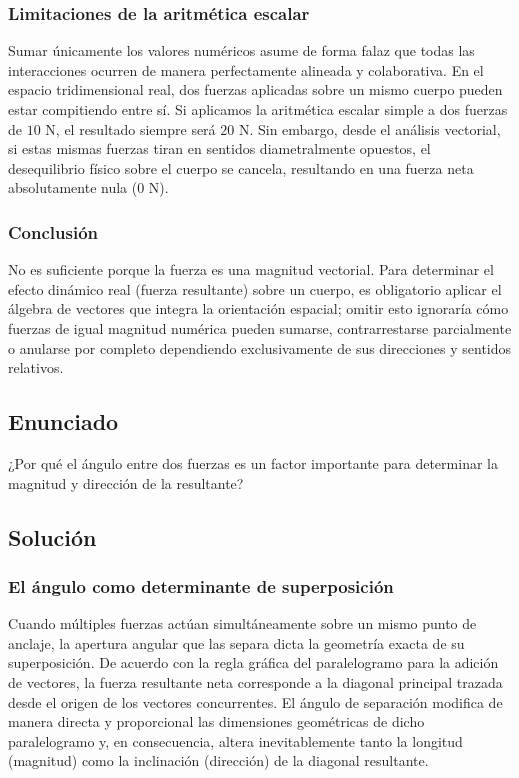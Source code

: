 \documentclass[12pt, a4paper]{article}
\begin{document}
\subsubsection*{Limitaciones de la aritmética escalar}
Sumar únicamente los valores numéricos asume de forma falaz que todas las interacciones ocurren de manera perfectamente alineada y colaborativa. En el espacio tridimensional real, dos fuerzas aplicadas sobre un mismo cuerpo pueden estar compitiendo entre sí. Si aplicamos la aritmética escalar simple a dos fuerzas de $10 \text{ N}$, el resultado siempre será $20 \text{ N}$. Sin embargo, desde el análisis vectorial, si estas mismas fuerzas tiran en sentidos diametralmente opuestos, el desequilibrio físico sobre el cuerpo se cancela, resultando en una fuerza neta absolutamente nula ($0 \text{ N}$).

\subsubsection*{Conclusión}
No es suficiente porque la fuerza es una magnitud vectorial. Para determinar el efecto dinámico real (fuerza resultante) sobre un cuerpo, es obligatorio aplicar el álgebra de vectores que integra la orientación espacial; omitir esto ignoraría cómo fuerzas de igual magnitud numérica pueden sumarse, contrarrestarse parcialmente o anularse por completo dependiendo exclusivamente de sus direcciones y sentidos relativos.

\newpage

\subsection*{Enunciado}
¿Por qué el ángulo entre dos fuerzas es un factor importante para determinar la magnitud y dirección de la resultante?

\subsection*{Solución}

\subsubsection*{El ángulo como determinante de superposición}
Cuando múltiples fuerzas actúan simultáneamente sobre un mismo punto de anclaje, la apertura angular que las separa dicta la geometría exacta de su superposición. De acuerdo con la regla gráfica del paralelogramo para la adición de vectores, la fuerza resultante neta corresponde a la diagonal principal trazada desde el origen de los vectores concurrentes. El ángulo de separación modifica de manera directa y proporcional las dimensiones geométricas de dicho paralelogramo y, en consecuencia, altera inevitablemente tanto la longitud (magnitud) como la inclinación (dirección) de la diagonal resultante.
\end{document}
